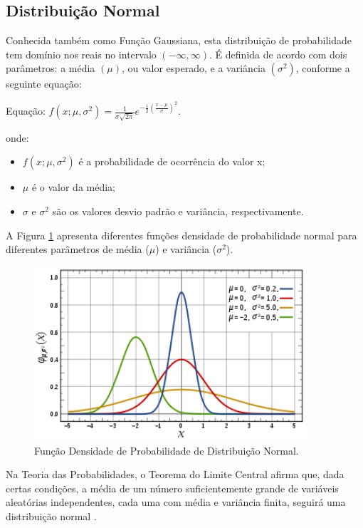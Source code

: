 \subsection{Distribuição Normal}

Conhecida também como Função Gaussiana, esta distribuição de probabilidade tem domínio nos reais no intervalo \((-\infty, \infty)\). É definida de acordo com dois parâmetros: a média \((\mu)\), ou valor esperado, e a variância \((\sigma^{2})\), conforme a seguinte equação:

Equação: \(f(x; \mu, \sigma^2) = \frac{1}{\sigma\sqrt{2\pi}}e^{-\frac{1}{2}(\frac{x - \mu}{\sigma})^2}\).

onde:
\begin{itemize}
	\item \(f(x; \mu, \sigma^2)\) é a probabilidade de ocorrência do valor x;
	\item \(\mu\) é o valor da média;
	\item \(\sigma\) e \(\sigma^{2}\) são os valores desvio padrão e variância, respectivamente.
\end{itemize}

A Figura \ref{fig:normaldist} apresenta diferentes funções densidade de probabilidade normal para diferentes parâmetros de média (\(\mu\)) e variância (\(\sigma^{2}\)).

\begin{figure}[!htb]
	\centering
	\includegraphics[width=0.9\textwidth]{./imgs/normaldist.png}
	\caption{Função Densidade de Probabilidade de Distribuição Normal.}
	\label{fig:normaldist}
\end{figure}

Na Teoria das Probabilidades, o Teorema do Limite Central afirma que, dada certas condições, a média de um número suficientemente grande de variáveis aleatórias independentes, cada uma com média e variância finita, seguirá uma distribuição normal \cite{teoremalimitecentral}.


